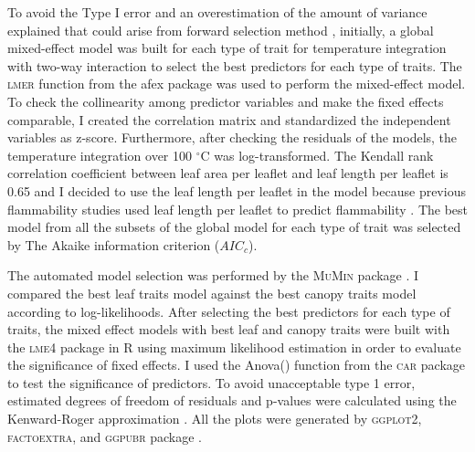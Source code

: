 \documentclass[12pt]{report}
\newcommand{\pkg}[1]{\textsc{#1}}
\begin{document}
To avoid the  Type I error and an overestimation of the amount of variance explained that could arise from forward selection method \citep{blanchet2008forward}, initially, a global mixed-effect model was built for each type of trait for temperature integration with two-way interaction to select the best predictors for each type of traits.
The \pkg{lmer} function from the afex package \citep{singmann2015packageafex,afexluke2017evaluating} was used to perform the mixed-effect model.
To check the collinearity among predictor variables and make the fixed effects comparable, I created the correlation matrix and standardized the independent variables as z-score. Furthermore, after checking the residuals of the models, the temperature integration over 100 $^{\circ}$C was log-transformed. 
The Kendall rank correlation coefficient between leaf area per leaflet and leaf length per leaflet is 0.65 and I decided to use the leaf length per leaflet in the model because previous flammability studies used leaf length per leaflet to predict flammability \citep{alam2020shoot}. 
The best model from all the subsets of the global model for each type of trait was selected by The Akaike information criterion ($AIC_{c}$).

The automated model selection was performed by the \pkg{MuMin} package \citep{barton2015packagemumin}. I compared the best leaf traits model against the best canopy traits model according to log-likelihoods. After selecting the best predictors for each type of traits, the mixed effect models with best leaf and canopy traits were built with the \pkg{lme4} package in R \citep{bates2009package} using maximum likelihood estimation in order to evaluate the significance of fixed effects. I used the Anova() function from the \pkg{car} package \citep{fox2013hypothesis} to test the significance of predictors. To avoid unacceptable type 1 error, estimated degrees of freedom of residuals and p-values were calculated using the Kenward-Roger approximation \citep{kenward1997small}. All the plots were generated by \pkg{ggplot2}, \pkg{factoextra}, and \pkg{ggpubr} package \citep{wickham2016packageggplot2, kassambara2017packagefactoextra,kassambara2020package}.
\end{document}
